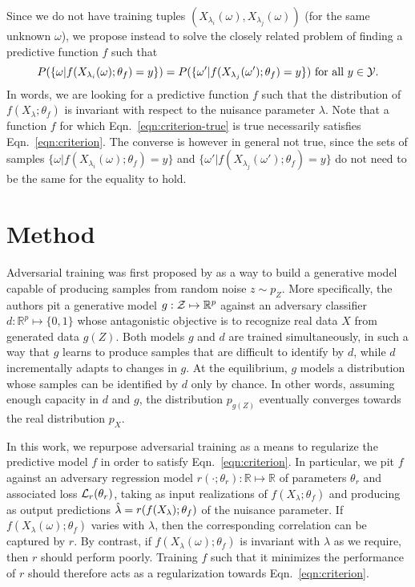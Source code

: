 \documentclass{article}
\theoremstyle{plain}
\begin{document}
Since we do not have training tuples $(X_{\lambda_i}(\omega),
X_{\lambda_j}(\omega))$ (for the same unknown $\omega$), we propose instead to
solve the closely related problem of finding a predictive function $f$ such that
\begin{equation}\label{eqn:criterion}
    P(\{ \omega | f(X_{\lambda_i}(\omega) ; \theta_f) = y \} ) = P( \{ \omega' | f(X_{\lambda_j}(\omega') ; \theta_f) = y\}) \text{ for all $y \in {\cal Y}$}.
\end{equation}
In words, we are looking for a predictive function $f$ such that  the
distribution of $f(X_\lambda; \theta_f)$ is invariant with respect to the nuisance
parameter $\lambda$. Note that a function $f$ for which Eqn.~\ref{eqn:criterion-true} is
true necessarily satisfies Eqn.~\ref{eqn:criterion}. The converse is however in
general not true, since the sets of samples $\{ \omega | f(X_{\lambda_i}(\omega); \theta_f) = y \}$
and $\{ \omega' | f(X_{\lambda_j}(\omega'); \theta_f) = y \}$ do not need to be the same
for the equality to hold.


\section{Method}
\label{sec:method}

Adversarial training was first proposed by \cite{goodfellow2014generative} as a
way to build a generative model capable of producing samples from random noise
$z \sim p_Z$. More specifically, the authors pit a generative model $g: {\cal Z}
\mapsto \mathbb{R}^p$ against an adversary classifier $d : \mathbb{R}^p \mapsto \{
0, 1\}$ whose antagonistic objective is to recognize real data $X$ from generated data $g(Z)$. Both
models $g$ and $d$ are trained simultaneously, in such a way that $g$ learns to
produce samples that are difficult to identify by $d$, while $d$ incrementally
adapts to changes in $g$. At the equilibrium, $g$ models a distribution whose
samples can be identified by $d$ only by chance. In other words, assuming enough
capacity in $d$ and  $g$, the distribution $p_{g(Z)}$ eventually converges
towards the real distribution $p_X$.

In this work, we repurpose adversarial training as a means to regularize the
predictive model $f$ in order to satisfy Eqn.~\ref{eqn:criterion}. In
particular, we pit $f$ against an adversary regression model $r(\cdot ;
\theta_r) : \mathbb{R} \mapsto \mathbb{R}$ of parameters $\theta_r$ and
associated loss ${\cal L}_r(\theta_r)$, taking as input realizations of $f(X_\lambda; \theta_f)$
and producing as output predictions $\smash{\hat\lambda} = r(f(X_\lambda); \theta_f)$
of the nuisance parameter. If $f(X_\lambda(\omega); \theta_f)$ varies with $\lambda$,
then the corresponding correlation can be captured by $r$. By contrast, if
$f(X_\lambda(\omega); \theta_f)$ is invariant with $\lambda$ as we require, then $r$
should perform poorly. Training $f$ such that it minimizes the performance of $r$
should therefore acts as a regularization towards Eqn.~\ref{eqn:criterion}.
\end{document}
